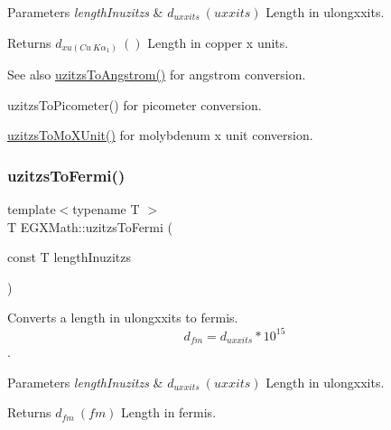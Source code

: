 \begin{DoxyParams}{Parameters}
{\em length\+Inuzitzs} & $ d_{uxxits}\ (uxxits)$ Length in ulongxxits. \\
\hline
\end{DoxyParams}
\begin{DoxyReturn}{Returns}
$ d_{xu(Cu\ K\alpha_1)}\ ()$ Length in copper x units. 
\end{DoxyReturn}
\begin{DoxySeeAlso}{See also}
\mbox{\hyperlink{group___e_g_x_math-_conversions-_length_conversions-uzitzs-_non-_s_i_gaaaecee65b1db5abcc71e18526e7073eb}{uzitzs\+To\+Angstrom()}} for angstrom conversion. 

uzitzs\+To\+Picometer() for picometer conversion. 

\mbox{\hyperlink{group___e_g_x_math-_conversions-_length_conversions-uzitzs-_non-_s_i_ga64b556911b0bb06cf315aa02f5e2d379}{uzitzs\+To\+Mo\+X\+Unit()}} for molybdenum x unit conversion. 
\end{DoxySeeAlso}
\mbox{\label{group___e_g_x_math-_conversions-_length_conversions-uzitzs-_non-_s_i_ga920cd8aae6bc9f70faa49a6a5c988040}} 
\subsubsection{\texorpdfstring{uzitzs\+To\+Fermi()}{uzitzsToFermi()}}
{\footnotesize\ttfamily template$<$typename T $>$ \\
T E\+G\+X\+Math\+::uzitzs\+To\+Fermi (\begin{DoxyParamCaption}\item[{const T}]{length\+Inuzitzs }\end{DoxyParamCaption})}



Converts a length in ulongxxits to fermis. \[ d_{fm}=d_{uxxits} * 10^{15} \]. 


\begin{DoxyParams}{Parameters}
{\em length\+Inuzitzs} & $ d_{uxxits}\ (uxxits)$ Length in ulongxxits. \\
\hline
\end{DoxyParams}
\begin{DoxyReturn}{Returns}
$ d_{fm}\ (fm)$ Length in fermis. 
\end{DoxyReturn}
\mbox{\label{group___e_g_x_math-_conversions-_length_conversions-uzitzs-_non-_s_i_ga695a8fd8870537930d6378e99ad2aa9f}} 
